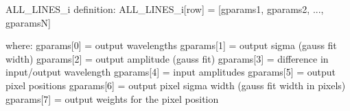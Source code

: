 \begin{minipage}{\textwidth}
\begin{pythondocstring}
ALL_LINES_i definition:
    ALL_LINES_i[row] = [gparams1, gparams2, ..., gparamsN]

                where:
                    gparams[0] = output wavelengths
                    gparams[1] = output sigma (gauss fit width)
                    gparams[2] = output amplitude (gauss fit)
                    gparams[3] = difference in input/output wavelength
                    gparams[4] = input amplitudes
                    gparams[5] = output pixel positions
                    gparams[6] = output pixel sigma width
                                      (gauss fit width in pixels)
                    gparams[7] = output weights for the pixel position
\end{pythondocstring}
\end{minipage}

